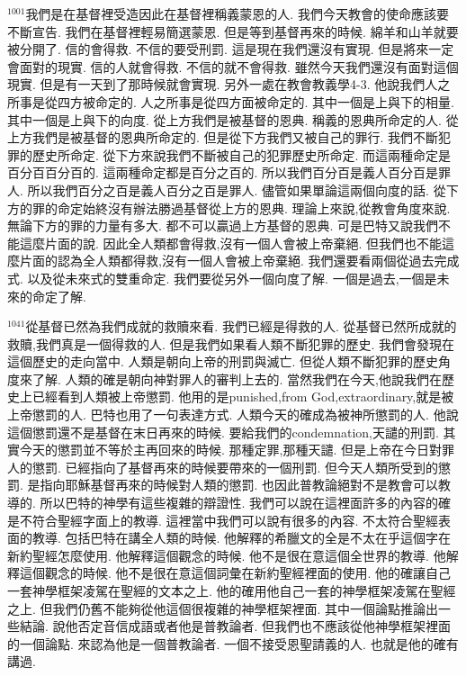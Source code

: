 \documentclass{book}
\begin{document}
$^{1001}$我們是在基督裡受造因此在基督裡稱義蒙恩的人.
我們今天教會的使命應該要不斷宣告.
我們在基督裡輕易簡選蒙恩.
但是等到基督再來的時候.
綿羊和山羊就要被分開了.
信的會得救.
不信的要受刑罰.
這是現在我們還沒有實現.
但是將來一定會面對的現實.
信的人就會得救.
不信的就不會得救.
雖然今天我們還沒有面對這個現實.
但是有一天到了那時候就會實現.
另外一處在教會教義學4-3.
他說我們人之所事是從四方被命定的.
人之所事是從四方面被命定的.
其中一個是上與下的相量.
其中一個是上與下的向度.
從上方我們是被基督的恩典.
稱義的恩典所命定的人.
從上方我們是被基督的恩典所命定的.
但是從下方我們又被自己的罪行.
我們不斷犯罪的歷史所命定.
從下方來說我們不斷被自己的犯罪歷史所命定.
而這兩種命定是百分百百分百的.
這兩種命定都是百分之百的.
所以我們百分百是義人百分百是罪人.
所以我們百分之百是義人百分之百是罪人.
儘管如果單論這兩個向度的話.
從下方的罪的命定始終沒有辦法勝過基督從上方的恩典.
理論上來說,從教會角度來說.
無論下方的罪的力量有多大.
都不可以贏過上方基督的恩典.
可是巴特又說我們不能這麼片面的說.
因此全人類都會得救,沒有一個人會被上帝棄絕.
但我們也不能這麼片面的認為全人類都得救,沒有一個人會被上帝棄絕.
我們還要看兩個從過去完成式.
以及從未來式的雙重命定.
我們要從另外一個向度了解.
一個是過去,一個是未來的命定了解.

$^{1041}$從基督已然為我們成就的救贖來看.
我們已經是得救的人.
從基督已然所成就的救贖,我們真是一個得救的人.
但是我們如果看人類不斷犯罪的歷史.
我們會發現在這個歷史的走向當中.
人類是朝向上帝的刑罰與滅亡.
但從人類不斷犯罪的歷史角度來了解.
人類的確是朝向神對罪人的審判上去的.
當然我們在今天,他說我們在歷史上已經看到人類被上帝懲罰.
他用的是punished,from God,extraordinary,就是被上帝懲罰的人.
巴特也用了一句表達方式.
人類今天的確成為被神所懲罰的人.
他說這個懲罰還不是基督在末日再來的時候.
要給我們的condemnation,天譴的刑罰.
其實今天的懲罰並不等於主再回來的時候.
那種定罪,那種天譴.
但是上帝在今日對罪人的懲罰.
已經指向了基督再來的時候要帶來的一個刑罰.
但今天人類所受到的懲罰.
是指向耶穌基督再來的時候對人類的懲罰.
也因此普教論絕對不是教會可以教導的.
所以巴特的神學有這些複雜的辯證性.
我們可以說在這裡面許多的內容的確是不符合聖經字面上的教導.
這裡當中我們可以說有很多的內容.
不太符合聖經表面的教導.
包括巴特在講全人類的時候.
他解釋的希臘文的全是不太在乎這個字在新約聖經怎麼使用.
他解釋這個觀念的時候.
他不是很在意這個全世界的教導.
他解釋這個觀念的時候.
他不是很在意這個詞彙在新約聖經裡面的使用.
他的確讓自己一套神學框架凌駕在聖經的文本之上.
他的確用他自己一套的神學框架凌駕在聖經之上.
但我們仍舊不能夠從他這個很複雜的神學框架裡面.
其中一個論點推論出一些結論.
說他否定音信成語或者他是普教論者.
但我們也不應該從他神學框架裡面的一個論點.
來認為他是一個普教論者.
一個不接受恩聖請義的人.
也就是他的確有講過.
\end{document}
